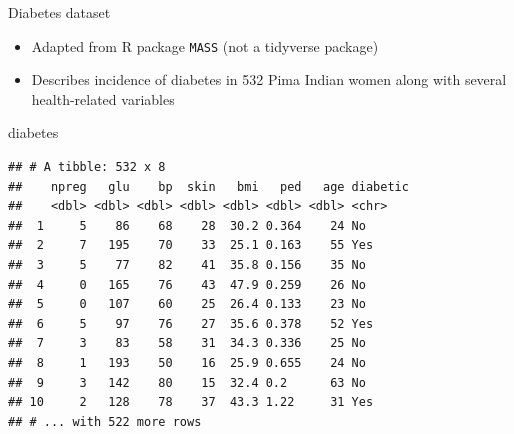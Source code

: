 \documentclass[
  ignorenonframetext,
]{beamer}
\newenvironment{Shaded}{\begin{snugshade}}{\end{snugshade}}
\newcommand{\NormalTok}[1]{#1}
\providecommand{\tightlist}{%
  \setlength{\itemsep}{0pt}\setlength{\parskip}{0pt}}
\begin{document}
\begin{frame}[fragile]{Diabetes dataset}
\protect\hypertarget{diabetes-dataset}{}
\begin{itemize}
\tightlist
\item
  Adapted from R package \texttt{MASS} (not a tidyverse package)
\item
  Describes incidence of diabetes in 532 Pima Indian women along with
  several health-related variables
\end{itemize}

\begin{Shaded}
\begin{Highlighting}[]
\NormalTok{diabetes}
\end{Highlighting}
\end{Shaded}

\begin{verbatim}
## # A tibble: 532 x 8
##    npreg   glu    bp  skin   bmi   ped   age diabetic
##    <dbl> <dbl> <dbl> <dbl> <dbl> <dbl> <dbl> <chr>   
##  1     5    86    68    28  30.2 0.364    24 No      
##  2     7   195    70    33  25.1 0.163    55 Yes     
##  3     5    77    82    41  35.8 0.156    35 No      
##  4     0   165    76    43  47.9 0.259    26 No      
##  5     0   107    60    25  26.4 0.133    23 No      
##  6     5    97    76    27  35.6 0.378    52 Yes     
##  7     3    83    58    31  34.3 0.336    25 No      
##  8     1   193    50    16  25.9 0.655    24 No      
##  9     3   142    80    15  32.4 0.2      63 No      
## 10     2   128    78    37  43.3 1.22     31 Yes     
## # ... with 522 more rows
\end{verbatim}
\end{frame}
\end{document}
